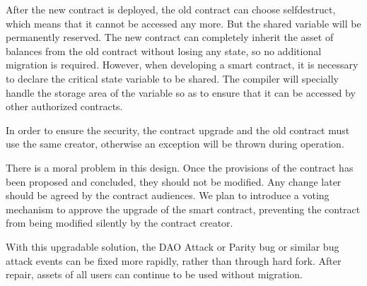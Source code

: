 After the new contract is deployed, the old contract can choose selfdestruct, which means that it cannot be accessed any more. But the shared variable will be permanently reserved. The new contract can completely inherit the asset of balances from the old contract without losing any state, so no additional migration is required. However, when developing a smart contract, it is necessary to declare the critical state variable to be shared. The compiler will specially handle the storage area of the variable so as to ensure that it can be accessed by other authorized contracts.

In order to ensure the security, the contract upgrade and the old contract must use the same creator, otherwise an exception will be thrown during operation.

There is a moral problem in this design. Once the provisions of the contract has been proposed and concluded, they should not be modified. Any change later should be agreed by the contract audiences. We plan to introduce a voting mechanism to approve the upgrade of the smart contract, preventing the contract from being modified silently by the contract creator.

With this upgradable solution, the DAO Attack or Parity bug or similar bug attack events can be fixed more rapidly, rather than through hard fork. After repair, assets of all users can continue to be used without migration.